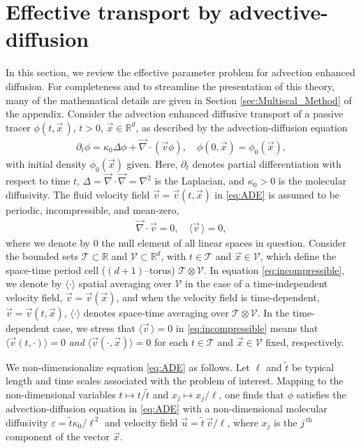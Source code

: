 \documentclass[11pt]{amsart}
\newcommand{\Tc}{\mathcal{T}}
\newcommand{\Vc}{\mathcal{V}}
\begin{document}
\section{Effective transport by
  advective-diffusion} \label{sec:Eff_Trans}  
%
In this section, we review the effective parameter problem for
advection enhanced diffusion. For completeness and to streamline the
presentation of this theory, many of the mathematical details are
given in Section \ref{sec:Multiscal_Method} of the appendix.
Consider the advection enhanced diffusive transport of a passive
tracer $\phi(t,\vec{x}\,)$, $t>0$, $\vec{x}\in\mathbb{R}^d$, as described by
the advection-diffusion equation 
%
\begin{align}\label{eq:ADE}
  \partial_t\phi=\kappa_0\Delta \phi+\vec{\nabla}\cdot(\vec{v}\phi), \quad
  \phi(0,\vec{x})=\phi_0(\vec{x}),
\end{align}
% 
with initial density $\phi_0(\vec{x})$ given. Here, $\partial_t$ denotes partial
differentiation with respect to time $t$, $\Delta=\vec{\nabla}\cdot\vec{\nabla}=\nabla^2$ is
the Laplacian, and $\kappa_0>0$ is the molecular diffusivity. The fluid
velocity field $\vec{v}=\vec{v}(t,\vec{x})$ in \eqref{eq:ADE} is
assumed to be periodic, incompressible, and mean-zero, %
%
\begin{align}\label{eq:incompressible}
  \vec{\nabla}\cdot\vec{v}=0, \quad
  \langle\vec{v}\,\rangle=0,
\end{align}
%
where we denote by $0$ the null element of all linear spaces in
question. Consider the bounded sets $\Tc\subset\mathbb{R}$ and
$\Vc\subset\mathbb{R}^d$, with $t\in\Tc$ and $\vec{x}\in\Vc$, which define the  
space-time period cell ($(d+1)$--torus) $\Tc\otimes\Vc$. In equation
\eqref{eq:incompressible}, we denote by $\langle\cdot\rangle$ spatial averaging over
$\Vc$ in the case of a time-independent velocity field,
$\vec{v}=\vec{v}(\vec{x})$, and when the velocity field is
time-dependent, $\vec{v}=\vec{v}(t,\vec{x})$, $\langle\cdot\rangle$ denotes space-time
averaging over $\Tc\otimes\Vc$. In the time-dependent case, we stress that
$\langle\vec{v}\,\rangle=0$ in \eqref{eq:incompressible} means that
$\langle\vec{v}(t,\cdot)\rangle=0$ \emph{and} $\langle\vec{v}(\cdot,\vec{x})\rangle=0$ for each
$t\in\Tc$ and $\vec{x}\in\Vc$ fixed, respectively. 



We non-dimensionalize equation
\eqref{eq:ADE} as follows. Let $\ell$ and $\tilde{t}$ be typical length
and time scales associated with the problem of interest. Mapping to
the non-dimensional variables $t\mapsto t/\tilde{t}$ and $x_j\mapsto x_j/\ell$, one
finds that $\phi$ satisfies the advection-diffusion equation in
\eqref{eq:ADE} with a non-dimensional molecular diffusivity
$\varepsilon=\tilde{t}\kappa_0/\ell^{\,2}$ and velocity field
$\vec{u}=\tilde{t}\,\vec{v}/\ell$, where $x_j$ is the $j^{\,\text{th}}$
component of the vector $\vec{x}$. 
\end{document}

